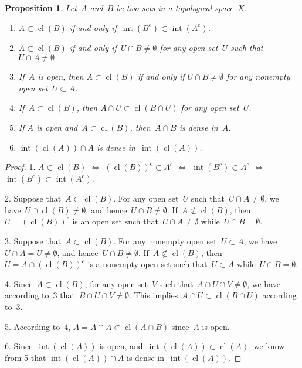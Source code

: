 \documentclass[11pt,a4paper]{article}
\newtheorem{proposition}{Proposition}[section]
\theoremstyle{definition}
\newcommand{\co}{{\mathrm{c}}}
\newcommand{\ie}{{i.e.}}
\DeclareMathOperator{\inter}{int}
\DeclareMathOperator{\cl}{cl}
\numberwithin{equation}{section}
\begin{document}
\begin{proposition}
  \label{prop:dense}
  Let~$A$ and~$B$ be two sets in a topological space~$X$. 
  \begin{enumerate}
    \item $A\subset \cl(B)$ if and only if~$\inter(B^\co ) \subset \inter(A^\co)$.
    \item $A \subset \cl(B)$ if and only if~$U\cap B \neq \emptyset$ for any open
      set~$U$ such that~$U \cap  A \neq \emptyset$ 
    \item \label{it:open} If~$A$ is open, then $A\subset \cl(B)$ if and only if $U\cap B \neq \emptyset$ for any
    nonempty open set~$U\subset A$.
  \item If~$A\subset \cl(B)$, then $A\cap U \subset \cl(B\cap U)$ for any open set~$U$.
   \item \label{it:dense}If $A$ is open and~$A\subset \cl(B)$, then~$A\cap B$ is dense in~$A$.
   \item \label{it:intcl} $\inter(\cl(A))\cap A$ is dense in~$\inter(\cl(A))$.
  \end{enumerate}
\end{proposition}

\begin{proof}
1. $A\subset \cl(B)$ $\Leftrightarrow$ $(\cl(B))^\co \subset A^\co $ 
$\Leftrightarrow$ $\inter(B^\co)  \subset A^\co$
$\Leftrightarrow$ $\inter(B^\co)  \subset \inter(A^\co)$.

2. Suppose that~$A\subset \cl(B)$. For any open set~$U$ such that~$U\cap A\neq \emptyset$, we
   have~$U\cap \cl(B)\neq \emptyset$, and hence~$U\cap B\neq \emptyset$. 
   If~$A\not\subset \cl(B)$, then~$U=(\cl(B))^\co$ is an open set such that~$U\cap A \neq \emptyset$
   while~$U\cap B = \emptyset$. 

3. Suppose that~$A\subset \cl(B)$. For any nonempty open set~$U\subset A$, we have~$U\cap A = U\neq \emptyset$, 
   and hence~$U\cap B\neq \emptyset$. 
   If~$A\not\subset \cl(B)$, then~$U=A\cap (\cl(B))^\co$ is a nonempty open set such that~$U\subset A$  
   while~$U\cap B = \emptyset$. 

4. Since~$A \subset \cl(B)$, for any open set~$V$ such that~$A\cap U\cap V\neq \emptyset$, we have
   according to~3 that~$B\cap U\cap V\neq \emptyset$. This implies~$A\cap U \subset \cl(B\cap U)$
   according to~3.  

5. According to~4, $A = A\cap A \subset \cl(A\cap B)$ since~$A$ is open.

6. Since~$\inter(\cl(A))$ is open, and~$\inter(\cl(A)) \subset \cl(A)$, we know from 5 that 
$\inter(\cl(A))\cap A$ is dense in~$\inter(\cl(A))$. 
\end{proof}
\end{document}
